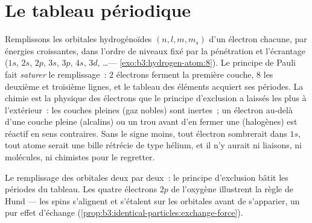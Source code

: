 \section{Le tableau périodique}

\begin{proposition}\label{prop:b3:identical-particles:periodic}
Remplissons les orbitales hydrogénoïdes $(n, l, m, m_s)$ d'un
électron chacune, par énergies croissantes, dans l'ordre de niveaux
fixé par la pénétration et l'écrantage ($1s$, $2s$, $2p$, $3s$, $3p$,
$4s$, $3d$, \dots --- \cref{exo:b3:hydrogen-atom:8}). Le principe de
Pauli fait \emph{saturer} le remplissage~: $2$ électrons ferment la
première couche, $8$ les deuxième et troisième lignes, et le tableau
des éléments acquiert ses périodes. La chimie est la physique des
électrons que le principe d'exclusion a laissés les plus à
l'extérieur~: les couches pleines (gaz nobles) sont inertes~; un
électron au-delà d'une couche pleine (alcalins) ou un trou avant
d'en fermer une (halogènes) est réactif en sens contraires. Sans le
signe moins, tout électron sombrerait dans $1s$, tout atome serait
une bille rétrécie de type hélium, et il n'y aurait ni liaisons, ni
molécules, ni chimistes pour le regretter.
\end{proposition}
\admitted

\begin{omfigure}

{\small Le remplissage des orbitales deux par deux~: le principe
d'exclusion bâtit les périodes du tableau. Les quatre électrons $2p$
de l'oxygène illustrent la règle de Hund --- les spins s'alignent et
s'étalent sur les orbitales avant de s'apparier, un pur effet
d'échange (\cref{prop:b3:identical-particles:exchange-force}).}
\end{omfigure}


